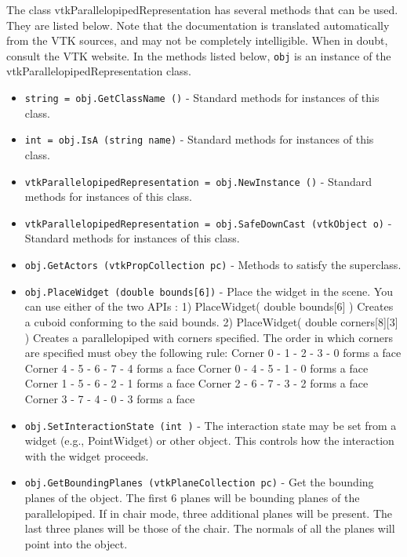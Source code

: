 The class vtkParallelopipedRepresentation has several methods that can be used.
  They are listed below.
Note that the documentation is translated automatically from the VTK sources,
and may not be completely intelligible.  When in doubt, consult the VTK website.
In the methods listed below, \verb|obj| is an instance of the vtkParallelopipedRepresentation class.
\begin{itemize}
\item  \verb|string = obj.GetClassName ()| -  Standard methods for instances of this class.

\item  \verb|int = obj.IsA (string name)| -  Standard methods for instances of this class.

\item  \verb|vtkParallelopipedRepresentation = obj.NewInstance ()| -  Standard methods for instances of this class.

\item  \verb|vtkParallelopipedRepresentation = obj.SafeDownCast (vtkObject o)| -  Standard methods for instances of this class.

\item  \verb|obj.GetActors (vtkPropCollection pc)| -  Methods to satisfy the superclass.

\item  \verb|obj.PlaceWidget (double bounds[6])| -  Place the widget in the scene. You can use either of the two APIs : 
 1) PlaceWidget( double bounds[6] ) 
      Creates a cuboid conforming to the said bounds.
 2) PlaceWidget( double corners[8][3] )
      Creates a parallelopiped with corners specified. The order in 
      which corners are specified must obey the following rule:
      Corner 0 - 1 - 2 - 3 - 0  forms a face
      Corner 4 - 5 - 6 - 7 - 4  forms a face
      Corner 0 - 4 - 5 - 1 - 0  forms a face
      Corner 1 - 5 - 6 - 2 - 1  forms a face
      Corner 2 - 6 - 7 - 3 - 2  forms a face
      Corner 3 - 7 - 4 - 0 - 3  forms a face

\item  \verb|obj.SetInteractionState (int )| -  The interaction state may be set from a widget (e.g., PointWidget) 
 or other object. This controls how the interaction with the
 widget proceeds.

\item  \verb|obj.GetBoundingPlanes (vtkPlaneCollection pc)| -  Get the bounding planes of the object. The first 6 planes will
 be bounding planes of the parallelopiped. If in chair mode, three 
 additional planes will be present. The last three planes will be those
 of the chair. The normals of all the planes will point into the object.


\end{itemize}
